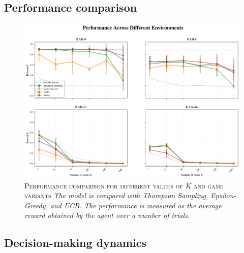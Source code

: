\subsection{Performance comparison}

\begin{figure}[h]
    \centering
    \includegraphics[width=1.\textwidth]{figures/performance_plot.png}
    \caption{\textsc{Performance comparison for different values of $K$ and game variants} \textit{The model is compared with Thompson Sampling, Epsilon-Greedy, and UCB. The performance is measured as the average reward obtained by the agent over a number of trials.}}
    \label{fig:perf_plot}
\end{figure}


\subsection{Decision-making dynamics}

